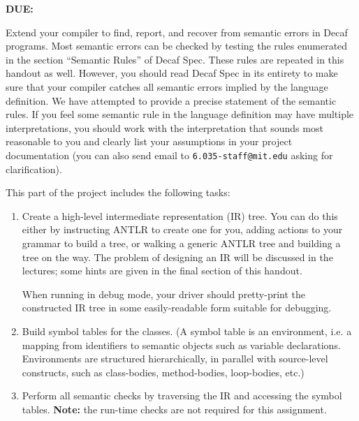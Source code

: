 
\thispagestyle{empty}

{\bnf
\gdef\kw#1{{\bnf K[#1]}}
\gdef\term#1{{\bnf T[#1]}}
\gdef\nt#1{{\bnf <#1>}}}


{\bf DUE: \CHECKERDUE}

Extend your compiler to find, report, and recover from semantic
errors in Decaf programs. Most semantic errors can be checked by
testing the rules enumerated in the section ``Semantic Rules'' of
Decaf Spec. These rules are repeated in this handout as well.
However, you should read Decaf Spec in its entirety to make sure that
your compiler catches all semantic errors implied by the language
definition. We have attempted to provide a precise statement of the
semantic rules. If you feel some semantic rule in the language
definition may have multiple interpretations, you should work with
the interpretation that sounds most reasonable to you and clearly
list your assumptions in your project documentation (you can also
send email to {\tt 6.035-staff@mit.edu} asking for clarification).

This part of the project includes the following tasks:

\begin{enumerate}

\item Create a high-level intermediate representation (IR) tree. You can do
this either by instructing ANTLR to create one for you, adding
actions to your grammar to build a tree, or walking a generic ANTLR
tree and building a tree on the way. The problem of designing an IR
will be discussed in the lectures; some hints are given in the final
section of this handout.

When running in debug mode, your driver should pretty-print the
constructed IR tree in some easily-readable form suitable for
debugging.

\item Build symbol tables for the classes.  (A symbol table is an
environment, i.e. a mapping from identifiers to semantic objects such
as variable declarations.  Environments are structured hierarchically,
in parallel with source-level constructs, such as class-bodies,
method-bodies, loop-bodies, etc.)

\item Perform all semantic checks by traversing the IR and
accessing the symbol tables. {\bf Note:} the run-time checks are
not required for this assignment.

\end{enumerate}


